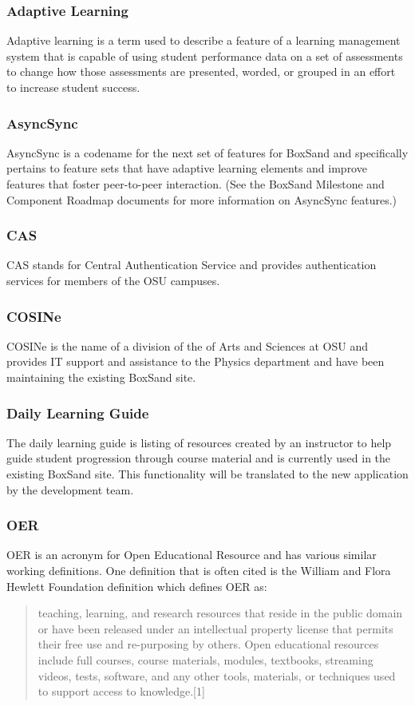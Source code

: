 \documentclass[onecolumn, draftclsnofoot,10pt, compsoc]{IEEEtran}
\begin{document}
\subsubsection{Adaptive Learning}
Adaptive learning is a term used to describe a feature of a learning management system that is capable of using student performance data on a set of assessments to change how those assessments are presented, worded, or grouped in an effort to increase student success. 

\subsubsection{AsyncSync}
AsyncSync is a codename for the next set of features for BoxSand and specifically pertains to feature sets that have adaptive learning elements and improve features that foster peer-to-peer interaction. (See the BoxSand Milestone and Component Roadmap documents for more information on AsyncSync features.)

\subsubsection{CAS}
CAS stands for Central Authentication Service and provides authentication services for members of the OSU campuses. 

\subsubsection{COSINe}
COSINe is the name of a division of the of Arts and Sciences at OSU and provides IT support and assistance to the Physics department and have been maintaining the existing BoxSand site.

\subsubsection{Daily Learning Guide}
The daily learning guide is listing of resources created by an instructor to help guide student progression through course material and is currently used in the existing BoxSand site. This functionality will be translated to the new application by the development team.

\subsubsection{OER}
OER is an acronym for Open Educational Resource and has various similar working definitions. One definition that is often cited is the William and Flora Hewlett Foundation definition which defines OER as:
\begin{quote}
teaching, learning, and research resources that reside in the public domain or have been released under an intellectual property license that permits their free use and re-purposing by others. Open educational resources include full courses, course materials, modules, textbooks, streaming videos, tests, software, and any other tools, materials, or techniques used to support access to knowledge.[1]
\end{quote}
\end{document}
